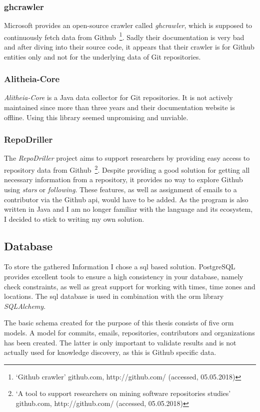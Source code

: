 \subsubsection{ghcrawler}
Microsoft provides an open-source crawler called \emph{ghcrawler}, which is supposed to continuously fetch data from Github~\footnote{`Github crawler' github.com, http://github.com/ (accessed, 05.05.2018)}.
Sadly their documentation is very bad and after diving into their source code, it appears that their crawler is for Github entities only and not for the underlying data of Git repositories.

\subsubsection{Alitheia-Core}
\emph{Alitheia-Core} is a Java data collector for Git repositories.
It is not actively maintained since more than three years and their documentation website is offline.
Using this library seemed unpromising and unviable.

\subsubsection{RepoDriller}
The \emph{RepoDriller} project aims to support researchers by providing easy access to repository data from Github~\footnote{`A tool to support researchers on mining software repositories studies' github.com, http://github.com/ (accessed, 05.05.2018)}.
Despite providing a good solution for getting all necessary information from a repository, it provides no way to explore Github using \emph{stars} or \emph{following}.
These features, as well as assignment of emails to a contributor via the Github \ac{api}, would have to be added.
As the program is also written in Java and I am no longer familiar with the language and its ecosystem, I decided to stick to writing my own solution.

\subsection{Database}\label{gitalizer-database}
To store the gathered Information I chose a \ac{sql} based solution.
PostgreSQL provides excellent tools to ensure a high consistency in your database, namely check constraints, as well as great support for working with times, time zones and locations.
The \ac{sql} database is used in combination with the \ac{orm} library \emph{SQLAlchemy}.

The basic schema created for the purpose of this thesis consists of five \ac{orm} models.
A model for commits, emails, repositories, contributors and organizations has been created.
The latter is only important to validate results and is not actually used for knowledge discovery, as this is Github specific data.

